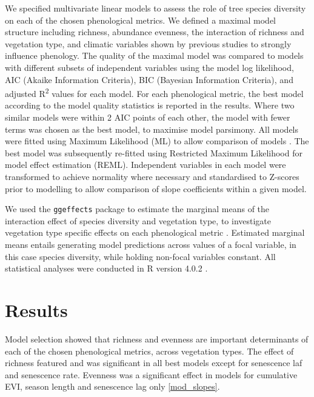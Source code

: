 \documentclass[11pt,a4paper]{article}
\begin{document}
We specified multivariate linear models to assess the role of tree species
diversity on each of the chosen phenological metrics. We defined a maximal model
structure including richness, abundance evenness, the interaction of richness
and vegetation type, and climatic variables shown by previous studies to
strongly influence phenology. The quality of the maximal model was compared to
models with different subsets of independent variables using the model log
likelihood, AIC (Akaike Information Criteria), BIC (Bayesian Information
Criteria), and adjusted R\textsuperscript{2} values for each model. For each
phenological metric, the best model according to the model quality statistics is
reported in the results. Where two similar models were within 2 AIC points of
each other, the model with fewer terms was chosen as the best model, to maximise
model parsimony. All models were fitted using Maximum Likelihood (ML) to allow
comparison of models \citep{}. The best model was subsequently re-fitted using
Restricted Maximum Likelihood for model effect estimation (REML). Independent
variables in each model were transformed to achieve normality where necessary
and standardised to Z-scores prior to modelling to allow comparison of slope
coefficients within a given model.

We used the \texttt{ggeffects} package to estimate the marginal means of the
interaction effect of species diversity and vegetation type, to investigate
vegetation type specific effects on each phenological metric \citep{ggeffects}.
Estimated marginal means entails generating model predictions across values of a
focal variable, in this case species diversity, while holding non-focal
variables constant. All statistical analyses were conducted in R version 4.0.2
\citep{R2020}.

\section{Results}

Model selection showed that richness and evenness are important determinants of
each of the chosen phenological metrics, across vegetation types. The effect of
richness featured and was significant in all best models except for senescence
laf and senescence rate. Evenness was a significant effect in models for
cumulative EVI, season length and senescence lag only \autoref{mod_slopes}.
\end{document}

